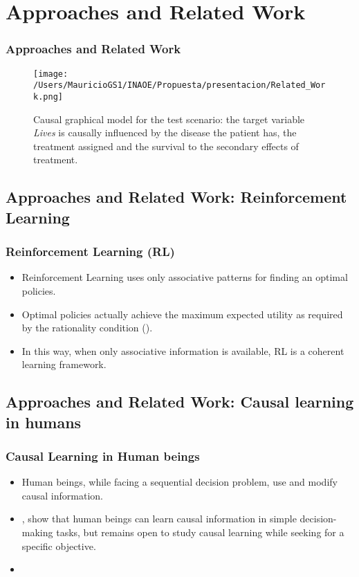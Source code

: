 \documentclass{beamer}
\theoremstyle{plain}
\begin{document}
\section{Approaches and Related Work}
\begin{frame}
\frametitle{Approaches and Related Work}
\begin{figure}[ht]
\vskip 0.2in
\begin{center}
\texttt{[image: /Users/MauricioGS1/INAOE/Propuesta/presentacion/Related\_Work.png]}
\caption{Causal graphical model for the test scenario: the target variable \textit{Lives} is causally influenced by the disease the patient has, the treatment assigned and the survival to the secondary effects of treatment.}
\label{causal_model}
\end{center}
\vskip -0.2in
\end{figure}
\end{frame} 
\subsection{Approaches and Related Work: Reinforcement Learning}
\begin{frame}
\frametitle{Reinforcement Learning (RL)}
\begin{itemize}
\item Reinforcement Learning uses only associative patterns for finding an optimal policies.
\item Optimal policies actually achieve the maximum expected utility as required by the rationality condition (\cite{webb2007game}).
\item In this way, when only associative information is available, RL is a coherent learning framework. 
\end{itemize}
\end{frame}

\subsection{Approaches and Related Work: Causal learning in humans}
\begin{frame}
\frametitle{Causal Learning in Human beings}
\begin{itemize}
\item Human beings, while facing a sequential decision problem, use and modify causal information.
\item \cite{hagmayer2009decision}, \cite{hagmayer2013repeated} show that human beings can learn causal information in simple decision-making tasks, but remains open to study causal learning while seeking for a specific objective. 
\item 
\end{itemize}
\end{frame}
\end{document}
